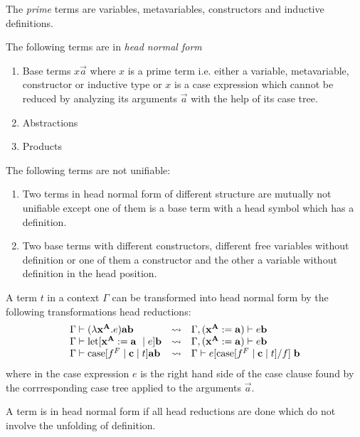 The \emph{prime} terms are variables, metavariables, constructors and inductive
definitions.

The following terms are in \emph{head normal form}
\begin{enumerate}
    \item Base terms $x \vec a$ where $x$ is a prime term i.e. either a variable,
        metavariable, constructor or inductive type or $x$ is a case expression
        which cannot be reduced by analyzing its arguments $\vec a$ with the help
        of its case tree.

    \item Abstractions

    \item Products
\end{enumerate}

The following terms are not unifiable:
\begin{enumerate}
    \item Two terms in head normal form of different structure are mutually not
        unifiable except one of them is a base term with a head symbol which has
        a definition.

    \item Two base terms with different constructors, different free variables
        without definition or one of them a constructor and the other a variable
        without definition in the head position.
\end{enumerate}

A term $t$ in a context $\Gamma$ can be transformed into head normal form by the
following transformations head reductions:
$$
\begin{array}{lll}
    \Gamma \vdash (\lambda \vec x^{\vec A}. e) \vec a \vec b
    &\leadsto&
    \Gamma, (\vec x^{\vec A} := \vec a) \vdash e \vec b
    \\
    \Gamma \vdash \llet[\vec x^{\vec A} := \vec a \mid e] \vec b
    &\leadsto&
    \Gamma, (\vec x^{\vec A} := \vec a) \vdash e \vec b
    \\
    \Gamma \vdash \case[f^F \mid \vec c \mid t] \vec a \vec b
    &\leadsto&
    \Gamma \vdash e[\case [f^F \mid \vec c \mid t] / f] \; \vec b
\end{array}
$$
where in the case expression $e$ is the right hand side of the case clause found
by the corrresponding case tree applied to the arguments $\vec a$.

A term is in head normal form if all head reductions are done which do not
involve the unfolding of definition.






